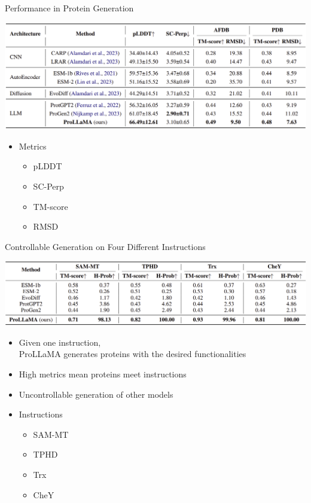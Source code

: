 \documentclass[dvipsnames]{beamer}
\begin{document}
\begin{frame}{Performance in Protein Generation}
	\begin{center}
		\includegraphics[scale=0.21]{tables/methods_comparison.png}
	\end{center}
	\begin{itemize}
		\item Metrics
		\begin{itemize}
			\item pLDDT
			\item SC-Perp
			\item TM-score
			\item RMSD
		\end{itemize}
	\end{itemize}
\end{frame}

\begin{frame}{Controllable Generation on Four Different Instructions}
	\begin{center}
		\includegraphics[scale=0.21]{tables/controlled_generation_comparison.png}
	\end{center}
	\begin{itemize}
		\item Given one instruction, \\ProLLaMA generates proteins with the desired functionalities
		\item High metrics mean proteins meet instructions
		\item Uncontrollable generation of other models
		\item Instructions
		\begin{itemize}
			\item SAM-MT
			\item TPHD
			\item Trx
			\item CheY
		\end{itemize}
	\end{itemize}
\end{frame}
\end{document}
